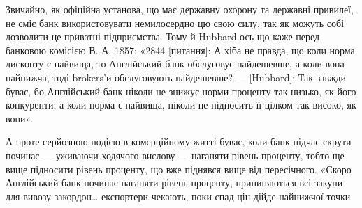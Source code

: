 Звичайно, як офіційна установа, що має державну охорону та державні
привилеї, не сміє банк використовувати немилосердно цю свою силу, так як
можуть собі дозволити це приватні підприємства. Тому й Hubbard ось що каже
перед банковою комісією В. А. 1857; «2844 [питання]: А хіба не правда, що
коли норма дисконту є найвища, то Англійський банк обслуговує найдешевше,
а коли вона найнижча, тоді brokers’и обслуговують найдешевше? — [Hubbard]:
Так завжди буває, бо Англійський банк ніколи не знижує норми проценту так
низько, як його конкуренти, а коли норма є найвища, ніколи не підносить її
цілком так високо, як вони».

А проте серйозною подією в комерційному житті буває, коли банк підчас
скрути починає — уживаючи ходячого вислову — наганяти рівень проценту, тобто
ще вище підносити рівень проценту, що вже піднявся вище від пересічного. «Скоро
Англійський банк починає наганяти рівень проценту, припиняються всі закупи
для вивозу закордон\dots{} експортери чекають, поки спад цін дійде найнижчої точки
\parbreak{}  %

